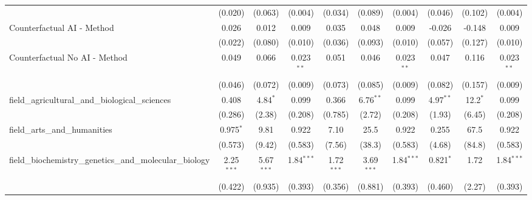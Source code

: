 \begin{tabular}{lccccccccc}
                                                               & (0.020)       & (0.063)       & (0.004)       & (0.034)       & (0.089)        & (0.004)       & (0.046)       & (0.102)       & (0.004)\\   
   Counterfactual AI - Method                                  & 0.026         & 0.012         & 0.009         & 0.035         & 0.048          & 0.009         & -0.026        & -0.148        & 0.009\\   
                                                               & (0.022)       & (0.080)       & (0.010)       & (0.036)       & (0.093)        & (0.010)       & (0.057)       & (0.127)       & (0.010)\\   
   Counterfactual No AI - Method                               & 0.049         & 0.066         & 0.023$^{**}$  & 0.051         & 0.046          & 0.023$^{**}$  & 0.047         & 0.116         & 0.023$^{**}$\\   
                                                               & (0.046)       & (0.072)       & (0.009)       & (0.073)       & (0.085)        & (0.009)       & (0.082)       & (0.157)       & (0.009)\\   
   field\_agricultural\_and\_biological\_sciences              & 0.408         & 4.84$^{*}$    & 0.099         & 0.366         & 6.76$^{**}$    & 0.099         & 4.97$^{**}$   & 12.2$^{*}$    & 0.099\\   
                                                               & (0.286)       & (2.38)        & (0.208)       & (0.785)       & (2.72)         & (0.208)       & (1.93)        & (6.45)        & (0.208)\\   
   field\_arts\_and\_humanities                                & 0.975$^{*}$   & 9.81          & 0.922         & 7.10          & 25.5           & 0.922         & 0.255         & 67.5          & 0.922\\   
                                                               & (0.573)       & (9.42)        & (0.583)       & (7.56)        & (38.3)         & (0.583)       & (4.68)        & (84.8)        & (0.583)\\   
   field\_biochemistry\_genetics\_and\_molecular\_biology      & 2.25$^{***}$  & 5.67$^{***}$  & 1.84$^{***}$  & 1.72$^{***}$  & 3.69$^{***}$   & 1.84$^{***}$  & 0.821$^{*}$   & 1.72          & 1.84$^{***}$\\   
                                                               & (0.422)       & (0.935)       & (0.393)       & (0.356)       & (0.881)        & (0.393)       & (0.460)       & (2.27)        & (0.393)\\   

\end{tabular}
